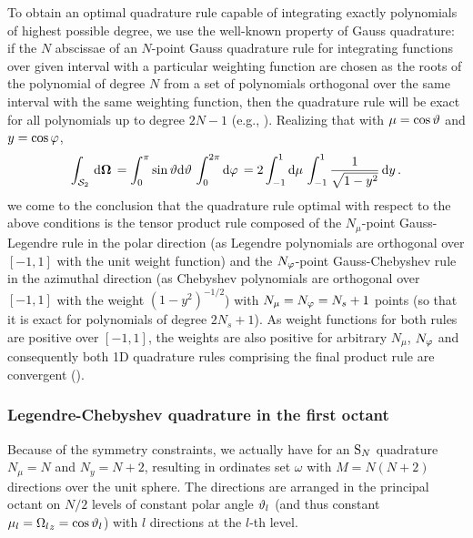 To obtain an optimal quadrature rule capable of integrating exactly polynomials of highest possible degree, we use the 
well-known property of Gauss quadrature: if the $N$ abscissae of an $N$-point Gauss quadrature rule for integrating
functions over given interval with a particular weighting function are chosen as the roots of the polynomial
of degree $N$ from a set of polynomials orthogonal over the same interval with the same weighting function,
then the quadrature rule will be exact for all polynomials up to degree $2N-1$ (e.g., \cite[Chap. 4]{Ralston}).
Realizing that with $\mu = \cos \vartheta$ and $y = \cos \varphi$,
$$
	\int_{\mathcal{S}_2}\,\text{d}\mathbf{\Omega}\, = \int_0^\pi\sin \vartheta\text{d}\vartheta\,\int_0^{2\pi}\text{d}\varphi\,
	 = 2\int_{-1}^{1}\text{d}\mu\,\int_{-1}^{1}\frac{1}{\sqrt{1-y^2}}\,\text{d}y\,. 
$$
we come to the conclusion that the quadrature rule optimal with respect to the above conditions is the tensor product
rule composed of the $N_\mu$-point Gauss-Legendre rule in the polar direction (as Legendre polynomials are orthogonal over
$[-1,1]$ with the unit weight function) and the $N_\varphi$-point Gauss-Chebyshev rule in the azimuthal direction (as
Chebyshev polynomials are orthogonal over $[-1,1]$ with the weight $(1-y^2)^{-1/2}$) with $N_\mu = N_\varphi
= N_s + 1$ points (so that it is exact for polynomials of degree $2 N_s + 1$). As weight functions for both rules are positive over $[-1,1]$, the
weights are also positive for arbitrary $N_\mu$, $N_\varphi$ and consequently both 1D quadrature rules comprising the
final product rule are convergent (\cite[Chap. 4]{Ralston}).

\subsubsection{Legendre-Chebyshev quadrature in the first octant}
Because of the symmetry constraints, we actually have for an $\text{S}_{N}$
quadrature $N_\mu = N$ and $N_y = N + 2$, resulting in ordinates set $\omega$ with $M = N(N+2)$ directions over the unit
sphere. The directions are arranged in the principal octant on $N/2$ levels of constant polar angle $\vartheta_l$ (and thus
constant $\mu_l = {\Omega_l}_z = \cos \vartheta_l$) with $l$ directions at the $l$-th level. 

